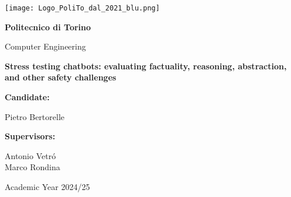 

\begin{titlepage}
    \begin{center}

        \texttt{[image: Logo\_PoliTo\_dal\_2021\_blu.png]}

        \vspace*{0.5cm}

        \LARGE
        \textbf{Politecnico di Torino}

        \vspace{0.5cm}
        \LARGE
        Computer Engineering

        \vspace*{1cm}
            
        \Huge
        \textbf{Stress testing chatbots: evaluating factuality, reasoning, abstraction, and other safety challenges}
            
                    
        \vspace{1.5cm}

        \Large
        \begin{minipage}[t]{0.4\textwidth}
             \textbf{Candidate:}
        \end{minipage}
        \hfill
        \begin{minipage}[t]{0.45\textwidth}
            \raggedleft
            Pietro Bertorelle
        \end{minipage}
            
            
        \vspace{1cm}
            
           
        \Large
        \begin{minipage}[t]{0.4\textwidth}
             \textbf{Supervisors:}
        \end{minipage}
        \hfill
        \begin{minipage}[t]{0.45\textwidth}
            \raggedleft
            Antonio Vetr\'o\\
            Marco Rondina\\
        \end{minipage}
        
        \vspace{2cm}
        Academic Year 2024/25
            
    \end{center}
\end{titlepage}


